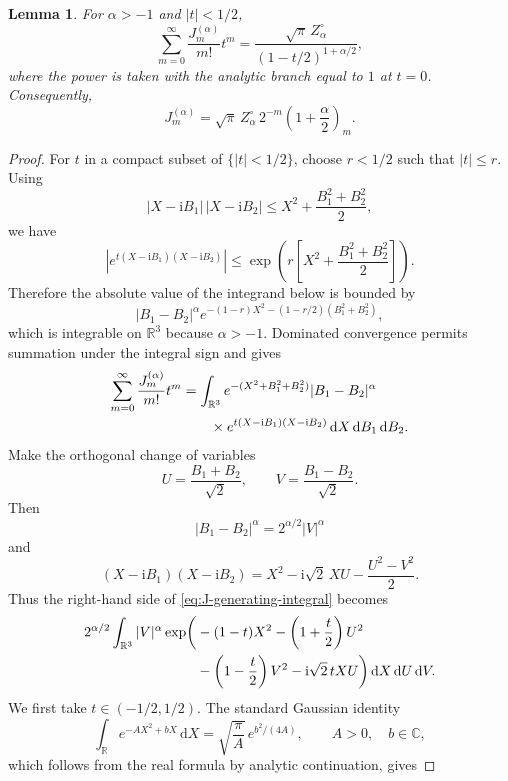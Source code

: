 \documentclass[11pt,reqno]{amsart}
\numberwithin{equation}{section}
\newtheorem{lemma}[theorem]{Lemma}
\theoremstyle{definition}
\theoremstyle{remark}
\newcommand{\R}{\mathbb R}
\newcommand{\C}{\mathbb C}
\newcommand{\1}{\mathbf 1}
\newcommand{\dd}{\mathrm d}
\newcommand{\ii}{\mathrm i}
\begin{document}
\begin{lemma}
For \(\alpha>-1\) and \(|t|<1/2\),
\begin{equation}\label{eq:J-alpha-generating}
  \sum_{m=0}^\infty\frac{J_m^{(\alpha)}}{m!}t^m
  =
  \frac{\sqrt\pi\,Z_\alpha^\circ}
       {(1-t/2)^{1+\alpha/2}},
\end{equation}
where the power is taken with the analytic branch equal to \(1\) at
\(t=0\).  Consequently,
\begin{equation}\label{eq:J-alpha-value}
  J_m^{(\alpha)}
  =
  \sqrt\pi\,Z_\alpha^\circ\,
  2^{-m}\left(1+\frac\alpha2\right)_m.
\end{equation}
\end{lemma}

\begin{proof}
For \(t\) in a compact subset of \(\{|t|<1/2\}\), choose \(r<1/2\) such
that \(|t|\le r\).  Using
\[
  |X-\ii B_1|\,|X-\ii B_2|
  \le
  X^2+\frac{B_1^2+B_2^2}{2},
\]
we have
\[
  \left|e^{t(X-\ii B_1)(X-\ii B_2)}\right|
  \le
  \exp\!\left(r\left[X^2+\frac{B_1^2+B_2^2}{2}\right]\right).
\]
Therefore the absolute value of the integrand below is bounded by
\[
  |B_1-B_2|^\alpha
  e^{-(1-r)X^2-(1-r/2)(B_1^2+B_2^2)},
\]
which is integrable on \(\R^3\) because \(\alpha>-1\).  Dominated
convergence permits summation under the integral sign and gives
\begin{align}
  \sum_{m=0}^\infty\frac{J_m^{(\alpha)}}{m!}t^m
  &=
  \int_{\R^3}
  e^{-(X^2+B_1^2+B_2^2)}|B_1-B_2|^\alpha
  \notag\\
  &\qquad\times
  e^{t(X-\ii B_1)(X-\ii B_2)}
  \,\dd X\,\dd B_1\,\dd B_2.
  \label{eq:J-generating-integral}
\end{align}
Make the orthogonal change of variables
\[
  U=\frac{B_1+B_2}{\sqrt2},
  \qquad
  V=\frac{B_1-B_2}{\sqrt2}.
\]
Then
\[
  |B_1-B_2|^\alpha=2^{\alpha/2}|V|^\alpha
\]
and
\[
  (X-\ii B_1)(X-\ii B_2)
  =
  X^2-\ii\sqrt2\,XU-\frac{U^2-V^2}{2}.
\]
Thus the right-hand side of \eqref{eq:J-generating-integral} becomes
\begin{align}
  2^{\alpha/2}
  \int_{\R^3}|V|^\alpha
  \exp\!\bigg(
  &-(1-t)X^2
   -\left(1+\frac t2\right)U^2 \notag\\
  &-\left(1-\frac t2\right)V^2
   -\ii\sqrt2\,tXU
  \bigg)
  \,\dd X\,\dd U\,\dd V.
  \label{eq:J-after-orthogonal-change}
\end{align}
We first take \(t\in(-1/2,1/2)\).  The standard Gaussian identity
\[
  \int_{\R}e^{-AX^2+bX}\,\dd X
  =
  \sqrt{\frac\pi A}\,e^{b^2/(4A)},
  \qquad A>0,\quad b\in\C,
\]
which follows from the real formula by analytic continuation, gives

\end{proof}
\end{document}
